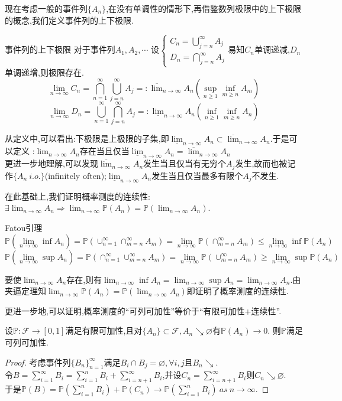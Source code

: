现在考虑一般的事件列$\{A_n\}$,在没有单调性的情形下,再借鉴数列极限中的上下极限的概念,我们定义事件列的上下极限.
\begin{definition}{事件列的上下极限}{}
    对于事件列$A_1,A_2,\cdots$
    设$\left\{\begin{aligned}C_n=\bigcup_{j=n}^{\infty}A_j\\D_n=\bigcap_{j=n}^{\infty}A_j\end{aligned}\right.$易知$C_n$单调递减,$D_n$单调递增,则极限存在.
   $$\lim_{n\to\infty}C_n=\bigcap_{n=1}^{\infty}\bigcup_{j=n}^{\infty}A_j=:\overline{\lim}_{n\to \infty}A_n(\sup_{n\geq 1}\inf_{m\geq n}A_m)$$ 
   $$\lim_{n\to\infty}D_n=\bigcup_{n=1}^{\infty}\bigcap_{j=n}^{\infty}A_j=:\underline{\lim}_{n\to\infty}A_n(\inf_{n\geq 1}\inf_{m\geq n}A_n)$$
\end{definition}
从定义中,可以看出:下极限是上极限的子集,即$\underline{\lim}_{n\to\infty}A_n\subset \overline{\lim}_{n\to \infty}A_n$.于是可以定义 :$\lim_{n\to\infty}A_n$存在当且仅当$\underline{\lim}_{n\to\infty}A_n=\overline{\lim}_{n\to \infty}A_n$\\
更进一步地理解,可以发现$\overline{\lim}_{n\to \infty}A_n$发生当且仅当有无穷个$A_j$发生,故而也被记作$\{A_n\ i.o.\}$(infinitely often);$\underline{\lim}_{n\to\infty}A_n$发生当且仅当最多有限个$A_j$不发生.

在此基础上,我们证明概率测度的连续性:$\exists\lim_{n\to\infty}A_n\Rightarrow\lim_{n\to\infty}\mathbb{P}(A_n)=\mathbb{P}(\lim_{n\to\infty}A_n)$.
\begin{lemma}{Fatou引理}{}
    $$\mathbb{P}(\lim_{n\to\infty}\inf A_n)=\mathbb{P}(\cup_{n=1}^{\infty}\cap_{m=n}^{\infty}A_m)=\lim_{n\to\infty}\mathbb{P}(\cap_{m=n}^{\infty}A_m)\leq\lim_{n\to\infty}\inf \mathbb{P}(A_n)$$
    $$\mathbb{P}(\lim_{n\to\infty}\sup A_n)=\mathbb{P}(\cap_{n=1}^{\infty}\cup_{m=n}^{\infty}A_m)=\lim_{n\to\infty}\mathbb{P}(\cup_{m=n}^{\infty}A_m)\geq\lim_{n\to\infty}\sup \mathbb{P}(A_n)$$
\end{lemma}
\noindent 要使$\lim_{n\to\infty}A_n$存在,则有$\lim_{n\to\infty}\inf A_n=\lim_{n\to\infty}\sup A_n=\lim_{n\to\infty}A_n$.由夹逼定理知$\lim_{n\to\infty}\mathbb{P}(A_n)=\mathbb{P}(\lim_{n\to\infty}A_n)$即证明了概率测度的连续性.

更进一步地,可以证明,概率测度的“可列可加性”等价于“有限可加性+连续性”.
\begin{proposition}
    设$\mathbb{P}:\mathcal{F}\to[0,1]$满足有限可加性,且对$\{A_n\}\subset \mathcal{F},A_n\searrow \varnothing$有$\mathbb{P}(A_n)\to 0$.
    则$\mathbb{P}$满足可列可加性.
\end{proposition}
\begin{proof}
    考虑事件列$\{B_n\}_{n=1}^{\infty}$满足$B_i\cap B_j=\varnothing,\forall i,j$且$B_n\searrow $.\\
    令$B=\sum_{i=1}^{\infty}B_i=\sum_{i=1}^{n}B_i+\sum_{i=n+1}^{\infty}B_i$,并设$C_n=\sum_{i=n+1}^{\infty}B_i$则$C_n\searrow\varnothing$.\\
    于是$\mathbb{P}(B)=\mathbb{P}(\sum_{i=1}^{n}B_i)+\mathbb{P}(C_n)\to\mathbb{P}(\sum_{i=1}^{n}B_i)\ as\ n\to\infty$.
\end{proof}
